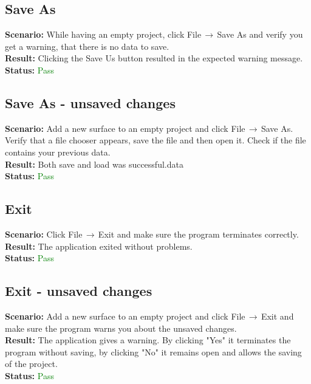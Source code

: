 \documentclass[a4paper, 11pt, article]{report}
\begin{document}
\subsection{Save As}

\noindent \textbf{Scenario:} While having an empty project, click File$\,\to\,$Save As and verify you get a warning, that there is no data to save.
\\
\noindent \textbf{Result:} Clicking the Save Us button resulted in the expected warning message.
\\
\noindent \textbf{Status:} \textcolor{green}{Pass}

\subsection{Save As - unsaved changes}

\noindent \textbf{Scenario:} Add a new surface to an empty project and click File$\,\to\,$Save As. Verify that a file chooser appears, save the file and then open it. Check if the file contains your previous data.
\\
\noindent \textbf{Result:} Both save and load was successful.data
\\
\noindent \textbf{Status:} \textcolor{green}{Pass}

\subsection{Exit}

\noindent \textbf{Scenario:} Click File$\,\to\,$Exit and make sure the program terminates correctly.
\\
\noindent \textbf{Result:} The application exited without problems.
\\
\noindent \textbf{Status:} \textcolor{green}{Pass}

\subsection{Exit - unsaved changes}

\noindent \textbf{Scenario:} Add a new surface to an empty project and click File$\,\to\,$Exit and make sure the program warns you about the unsaved changes.
\\
\noindent \textbf{Result:} The application gives a warning. By clicking "Yes" it terminates the program without saving, by clicking "No" it remains open and allows the saving of the project.
\\
\noindent \textbf{Status:} \textcolor{green}{Pass}
\end{document}
